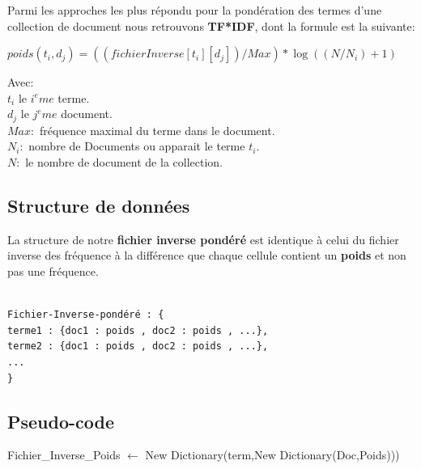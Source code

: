 \documentclass[12pt,a4paper,oneside]{article}
\begin{document}
Parmi les approches les plus répondu pour la pondération des termes d'une collection de document nous retrouvons \textbf{TF*IDF}, dont la formule est la suivante:
\begin{center}
	$poids(t_i,d_j)=((fichierInverse[t_i][d_j])/Max)* \log((N/N_i)+1)$
	
\end{center}
Avec:\\
$t_i$ le $i^eme$ terme.\\
$d_j$ le $j^eme$ document.\\
$Max: $ fréquence maximal du terme dans le document.\\
$N_i: $ nombre de Documents ou apparait le terme $t_i$.\\
$N: $ le nombre de document de la collection.\\

\subsection{Structure de données}
La structure de notre \textbf{fichier inverse pondéré} est identique à celui du fichier inverse des fréquence à la différence que chaque cellule contient un \textbf{poids} et non pas une fréquence.
\begin{lstlisting}

Fichier-Inverse-pondéré : {
terme1 : {doc1 : poids , doc2 : poids , ...},
terme2 : {doc1 : poids , doc2 : poids , ...},
...
}
\end{lstlisting}


\subsection{Pseudo-code}

\begin{algorithm}[H]
	\DontPrintSemicolon
	
	
	Fichier\_Inverse\_Poids $ \gets$ New Dictionary(term,New Dictionary(Doc,Poids)))
	
	
	
	\;
	\caption{{\sc  }}
	\label{algo:duplicate2}
\end{algorithm}

\newpage
\end{document}
